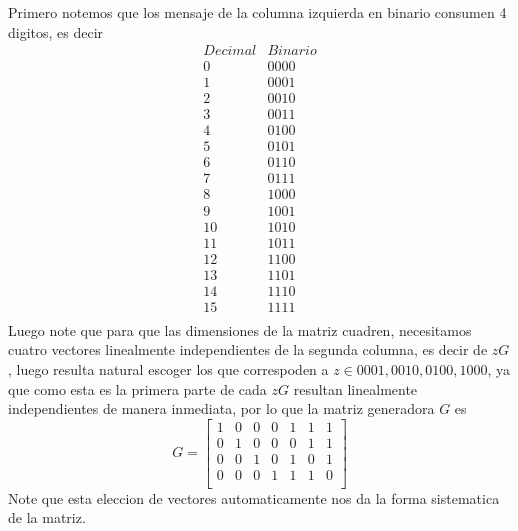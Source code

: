 \begin{sols}
    Primero notemos que los mensaje de la columna izquierda en binario consumen 4 digitos, es decir
    $$\begin{array}{c|c}
    Decimal & Binario\\
    0 & 0000 \\
1 & 0001 \\
2 & 0010 \\
3 & 0011 \\
4 & 0100 \\
5 & 0101 \\
6 & 0110 \\
7 & 0111 \\
8 & 1000 \\
9 & 1001 \\
10 & 1010 \\
11 & 1011 \\
12 & 1100 \\
13 & 1101 \\
14 & 1110 \\
15 & 1111 \\     
    \end{array}$$
    Luego note que para que las dimensiones de la matriz cuadren, necesitamos cuatro vectores linealmente independientes de la segunda columna, es decir de $zG$, luego resulta natural escoger los que correspoden a $z\in{0001,0010,0100,1000}$, ya que como esta es la primera parte de cada $zG$ resultan linealmente independientes de manera inmediata, por lo que la matriz generadora $G$ es
    $$G=\begin{bmatrix}
        1&0&0&0&1&1&1\\
        0&1&0&0&0&1&1\\
        0&0&1&0&1&0&1\\
        0&0&0&1&1&1&0\\

    \end{bmatrix}$$ 
    Note que esta eleccion de vectores automaticamente nos da la forma sistematica de la matriz.

\end{sols}

